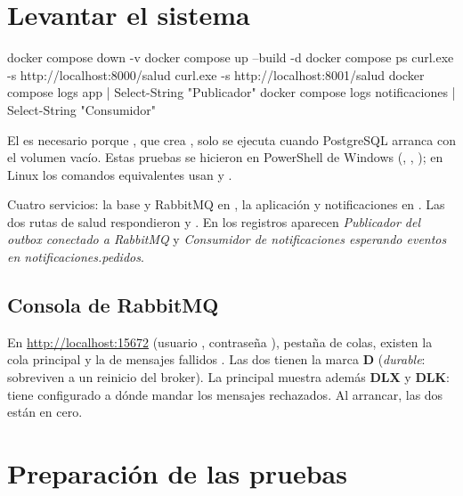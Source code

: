 \documentclass[11pt]{article}
\begin{document}
\section{Levantar el sistema}

\begin{comando}
docker compose down -v
docker compose up --build -d
docker compose ps
curl.exe -s http://localhost:8000/salud
curl.exe -s http://localhost:8001/salud
docker compose logs app | Select-String "Publicador"
docker compose logs notificaciones | Select-String "Consumidor"
\end{comando}

El  es necesario porque , que crea
, solo se ejecuta cuando PostgreSQL arranca con el volumen vacío. Estas
pruebas se hicieron en PowerShell de Windows (, ,
); en Linux los comandos equivalentes usan  y .

\observado Cuatro servicios: la base y RabbitMQ en , la aplicación y notificaciones en
. Las dos rutas de salud respondieron  y
. En los registros aparecen
\emph{Publicador del outbox conectado a RabbitMQ} y
\emph{Consumidor de notificaciones esperando eventos en notificaciones.pedidos}.


\subsection{Consola de RabbitMQ}
En \url{http://localhost:15672} (usuario , contraseña ), pestaña de colas, existen la
cola principal  y la de mensajes fallidos .
Las dos tienen la marca \textbf{D} (\emph{durable}: sobreviven a un reinicio del broker). La principal
muestra además \textbf{DLX} y \textbf{DLK}: tiene configurado a dónde mandar los mensajes rechazados.
Al arrancar, las dos están en cero.

\section{Preparación de las pruebas}
\end{document}
